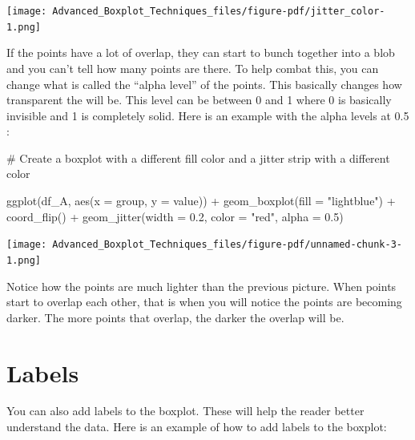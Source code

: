 \documentclass[
  letterpaper,
  DIV=11,
  numbers=noendperiod]{scrreprt}
\newenvironment{Shaded}{\begin{snugshade}}{\end{snugshade}}
\newcommand{\AttributeTok}[1]{\textcolor[rgb]{0.40,0.45,0.13}{#1}}
\newcommand{\CommentTok}[1]{\textcolor[rgb]{0.37,0.37,0.37}{#1}}
\newcommand{\FloatTok}[1]{\textcolor[rgb]{0.68,0.00,0.00}{#1}}
\newcommand{\FunctionTok}[1]{\textcolor[rgb]{0.28,0.35,0.67}{#1}}
\newcommand{\NormalTok}[1]{\textcolor[rgb]{0.00,0.23,0.31}{#1}}
\newcommand{\SpecialCharTok}[1]{\textcolor[rgb]{0.37,0.37,0.37}{#1}}
\newcommand{\StringTok}[1]{\textcolor[rgb]{0.13,0.47,0.30}{#1}}
\begin{document}
\begin{center}
\texttt{[image: Advanced\_Boxplot\_Techniques\_files/figure-pdf/jitter\_color-1.png]}
\end{center}

If the points have a lot of overlap, they can start to bunch together
into a blob and you can't tell how many points are there. To help combat
this, you can change what is called the ``alpha level'' of the points.
This basically changes how transparent the will be. This level can be
between 0 and 1 where 0 is basically invisible and 1 is completely
solid. Here is an example with the alpha levels at 0.5 :

\begin{Shaded}
\begin{Highlighting}[]
\CommentTok{\# Create a boxplot with a different fill color and a jitter strip with a different color}

\FunctionTok{ggplot}\NormalTok{(df\_A, }\FunctionTok{aes}\NormalTok{(}\AttributeTok{x =}\NormalTok{ group, }\AttributeTok{y =}\NormalTok{ value)) }\SpecialCharTok{+}
  \FunctionTok{geom\_boxplot}\NormalTok{(}\AttributeTok{fill =} \StringTok{"lightblue"}\NormalTok{) }\SpecialCharTok{+}
  \FunctionTok{coord\_flip}\NormalTok{() }\SpecialCharTok{+}
  \FunctionTok{geom\_jitter}\NormalTok{(}\AttributeTok{width =} \FloatTok{0.2}\NormalTok{, }\AttributeTok{color =} \StringTok{"red"}\NormalTok{, }\AttributeTok{alpha =} \FloatTok{0.5}\NormalTok{)}
\end{Highlighting}
\end{Shaded}

\texttt{[image: Advanced\_Boxplot\_Techniques\_files/figure-pdf/unnamed-chunk-3-1.png]}

Notice how the points are much lighter than the previous picture. When
points start to overlap each other, that is when you will notice the
points are becoming darker. The more points that overlap, the darker the
overlap will be.

\section*{Labels}\label{labels}


You can also add labels to the boxplot. These will help the reader
better understand the data. Here is an example of how to add labels to
the boxplot:
\end{document}
